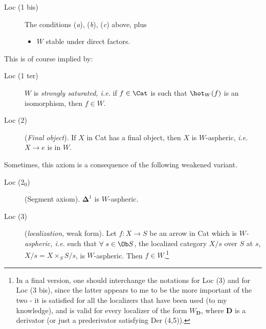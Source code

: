 \begin{description}
\item[Loc (1 bis)] The conditions (\textit{a}), (\textit{b}), (\textit{c}) above, plus
\begin{itemize}
\item[\textit{d})] $W$ stable under direct factors.
\end{itemize}
\end{description}

This is of course implied by:

\begin{description}
\item[Loc (1 ter)] $W$ is \textit{strongly saturated, i.e.} if $f \in \Cat$ is such that $\hot_W(f)$ is an isomorphism, then $f \in W$.
\item[Loc (2)] (\textit{Final object}). If $X$ in Cat has a final object, then $X$ is $W$-aspheric, \textit{i.e.} $X \longrightarrow e$ is in $W$.
\end{description}

Sometimes, this axiom is a consequence of the following weakened variant.

\begin{description}
\item[Loc (2$_0$)] (Segment axiom). $\boldsymbol{\Delta}^1$ is $W$-aspheric.
\end{description}


\begin{description}
\item[Loc (3)] (\textit{localization,} weak form). Let $f : X \longrightarrow S$ be an arrow in Cat which is $W$\textit{-aspheric, i.e.} such that $\forall\ s \in \Ob S$, the localized category $X/s$ over $S$ at $s$, $X/s = X \times_S S/s$, is $W$-aspheric. Then $f \in W$.\footnote[1]{In a final version, one should interchange the notations for Loc (3) and for Loc (3 bis), since the latter appears to me to be the more important of the two - it is satisfied for all the localizers that have been used (to my knowledge), and is valid for every localizer of the form $W_{\mathbf{D}}$, where $\mathbf{D}$ is a derivator (or just a prederivator satisfying Der (4,5)).} %
\end{description}

